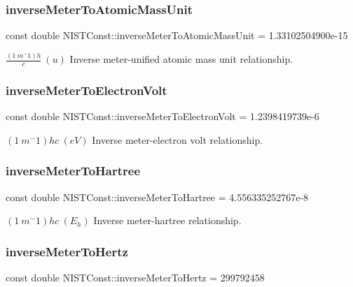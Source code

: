 \subsubsection{\texorpdfstring{inverse\+Meter\+To\+Atomic\+Mass\+Unit}{inverseMeterToAtomicMassUnit}}
{\footnotesize\ttfamily const double N\+I\+S\+T\+Const\+::inverse\+Meter\+To\+Atomic\+Mass\+Unit = 1.\+33102504900e-\/15}

$\frac{(1\ m^-1)h}{c} \ (u)$ Inverse meter-\/unified atomic mass unit relationship. \mbox{\label{group___inverse_meter_gafdede27a7699d3a180bb829b65fac447}} 
\subsubsection{\texorpdfstring{inverse\+Meter\+To\+Electron\+Volt}{inverseMeterToElectronVolt}}
{\footnotesize\ttfamily const double N\+I\+S\+T\+Const\+::inverse\+Meter\+To\+Electron\+Volt = 1.\+2398419739e-\/6}

$(1\ m^-1)hc \ (eV)$ Inverse meter-\/electron volt relationship. \mbox{\label{group___inverse_meter_ga6f47bdfe8997031b0f15229eb5bf4b9e}} 
\subsubsection{\texorpdfstring{inverse\+Meter\+To\+Hartree}{inverseMeterToHartree}}
{\footnotesize\ttfamily const double N\+I\+S\+T\+Const\+::inverse\+Meter\+To\+Hartree = 4.\+556335252767e-\/8}

$(1\ m^-1)hc \ (E_h)$ Inverse meter-\/hartree relationship. \mbox{\label{group___inverse_meter_ga5743c27316774c4f065336d0a016508e}} 
\subsubsection{\texorpdfstring{inverse\+Meter\+To\+Hertz}{inverseMeterToHertz}}
{\footnotesize\ttfamily const double N\+I\+S\+T\+Const\+::inverse\+Meter\+To\+Hertz = 299792458}

